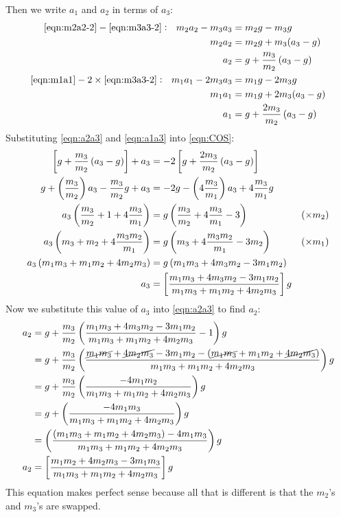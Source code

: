 \documentclass[11pt]{article}
\begin{document}
	\pagebreak
	Then we write $a_1$ and $a_2$ in terms of $a_3$:
	\begin{align}
		\eqref{eqn:m2a2-2} - \eqref{eqn:m3a3-2}:~~ m_2a_2 - m_3a_3 &= m_2 g - m_3g \notag\\
		m_2a_2 &= m_2 g + m_3(a_3-g) \notag\\
		a_2 &= g + \frac{m_3}{m_2}\left(a_3 - g\right) \label{eqn:a2a3}\\
		\eqref{eqn:m1a1} - 2 \times \eqref{eqn:m3a3-2}:~~ m_1a_1 - 2m_3a_3 &= m_1 g - 2m_3g\notag\\
		m_1a_1 &= m_1 g + 2m_3(a_3-g) \notag\\
		a_1 &= g + \frac{2m_3}{m_2}\left(a_3 - g\right) \label{eqn:a1a3}
	\end{align}
	Substituting \eqref{eqn:a2a3} and \eqref{eqn:a1a3} into \eqref{eqn:COS}:
	\begin{align}
		\left[g+\frac{m_3}{m_2}\left(a_3-g\right)\right] + a_3 &= -2\left[g + \frac{2m_3}{m_2}\left(a_3 - g\right)\right] \notag\\
		g + \left(\frac{m_3}{m_2}\right)a_3 - \frac{m_3}{m_2}g + a_3 &= -2g-\left(4 \frac{m_3}{m_1}\right)a_3 + 4 \frac{m_3}{m_1}g \notag\\
		a_3\left(\frac{m_3}{m_2} + 1 + 4 \frac{m_3}{m_1}\right) &= g\left(\frac{m_3}{m_2} + 4\frac{m_3}{m_1} - 3\right) &(\times m_2) \notag\\
		a_3\left(m_3+m_2+4\frac{m_3m_2}{m_1}\right) &= g\left(m_3+4\frac{m_3m_2}{m_1}-3m_2\right) &(\times m_1) \notag\\
		a_3\left(m_1m_3+m_1m_2+4m_2m_3\right) &= g\left(m_1m_3 + 4m_3m_2-3m_1m_2\right) \notag\\
		a_3 &= \left[\frac{m_1m_3 + 4m_3m_2-3m_1m_2}{m_1m_3+m_1m_2+4m_2m_3}\right]g \label{eqn:a_3-Soln}
	\end{align}
	Now we substitute this value of $a_3$ into \eqref{eqn:a2a3} to find $a_2$:
	\begin{align}
		a_2 &= g + \frac{m_3}{m_2}\left(\frac{m_1m_3 + 4m_3m_2-3m_1m_2}{m_1m_3+m_1m_2+4m_2m_3} - 1\right)g \notag\\
		&= g + \frac{m_3}{m_2}\left(\frac{\cancel{m_1m_3} + \cancel{4m_2m_3}-3m_1m_2-(\cancel{m_1m_3}+m_1m_2+\cancel{4m_2m_3})}{m_1m_3+m_1m_2+4m_2m_3}\right)g \notag\\
		&= g + \frac{m_3}{m_2}\left(\frac{-4m_1m_2}{m_1m_3+m_1m_2+4m_2m_3}\right)g \notag\\
		&= g + \left(\frac{-4m_1m_3}{m_1m_3+m_1m_2+4m_2m_3}\right)g \notag \\
		&= \left(\frac{(m_1m_3+m_1m_2+4m_2m_3)-4m_1m_3}{m_1m_3+m_1m_2+4m_2m_3}\right)g \notag \\
		a_2 &= \left[\frac{m_1m_2+4m_2m_3-3m_1m_3}{m_1m_3+m_1m_2+4m_2m_3}\right]g \label{eqn:a_2-Soln}
	\end{align}
	This equation makes perfect sense because all that is different is that the $m_2$'s and $m_3$'s are swapped.
	
\end{document}
